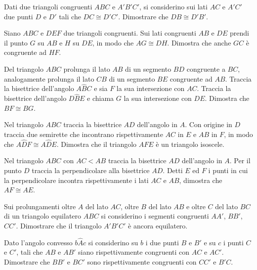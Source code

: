 \begin{multicols}{2}
\begin{esercizio}
\label{ese:2.12}
Dati due triangoli congruenti $ABC$ e $A'B'C'$, si considerino sui lati $AC$ e $A'C'$ due punti $D$ e $D'$ tali che $DC\cong D'C'$.  Dimostrare che $DB\cong D'B'$.
\end{esercizio}

\begin{esercizio}
\label{ese:2.13}
Siano $ABC$ e $DEF$ due triangoli congruenti. Sui lati congruenti $AB$ e $DE$ prendi il punto $G$ su $AB$ e $H$ su $DE$, in modo che $AG\cong DH$. Dimostra che anche $GC$ è congruente ad $HF$.
\end{esercizio}

\begin{esercizio}
\label{ese:2.14}
Del triangolo $ABC$ prolunga il lato $AB$ di un segmento $BD$ congruente a $BC$, analogamente prolunga il lato $CB$ di un segmento $BE$ congruente ad $AB$. Traccia la bisettrice dell'angolo $A\widehat{B}C$ e sia $F$ la sua intersezione con $AC$. Traccia la bisettrice dell'angolo $D\widehat{B}E$ e chiama $G$ la sua intersezione con $DE$. Dimostra che $BF\cong BG$.
\end{esercizio}

\begin{esercizio}
\label{ese:2.15}
Nel triangolo $ABC$ traccia la bisettrice $AD$ dell'angolo in $A$. Con origine in $D$ traccia due semirette che incontrano rispettivamente $AC$ in $E$ e $AB$ in $F$, in modo che $A\widehat{D}F\cong A\widehat{D}E$. Dimostra che il triangolo $AFE$ è un triangolo isoscele.
\end{esercizio}

\begin{esercizio}
\label{ese:2.16}
Nel triangolo $ABC$ con $AC<AB$ traccia la bisettrice $AD$ dell'angolo in $A$. Per il punto $D$ traccia la perpendicolare alla bisettrice $AD$. Detti $E$ ed $F$ i punti in cui la perpendicolare incontra rispettivamente i lati $AC$ e $AB$, dimostra che $AF\cong AE$.
\end{esercizio}

\begin{esercizio}
\label{ese:2.17}
Sui prolungamenti oltre $A$ del lato $AC$, oltre $B$ del lato $AB$ e oltre $C$ del lato $BC$ di un triangolo equilatero $ABC$ si considerino i segmenti congruenti $AA'$, $BB'$, $CC'$. Dimostrare che il triangolo $A'B'C'$ è ancora equilatero.
\end{esercizio}

\begin{esercizio}
\label{ese:2.18}
Dato l'angolo convesso $b\widehat{A}c$ si considerino su $b$ i due punti $B$ e $B'$ e su $c$ i punti $C$ e $C'$, tali che $AB$ e $AB'$ siano rispettivamente congruenti con $AC$ e $AC'$. Dimostrare che $BB'$ e $BC'$ sono rispettivamente congruenti con $CC'$ e $B'C$.
\end{esercizio}


\end{multicols}
